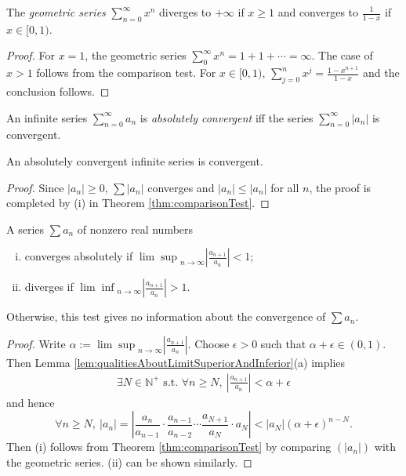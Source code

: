 \begin{thm}
  \label{thm:geometricSeries}
  The \emph{geometric series} $\sum_{n=0}^{\infty} x^n$
  diverges to $+\infty$ if $x\ge 1$
  and converges to $\frac{1}{1-x}$ if $x\in [0,1)$.
\end{thm}
\begin{proof}
  For $x=1$, the geometric series
  $\sum_0^{\infty} x^n = 1 + 1+\cdots = \infty$.
  The case of $x>1$ follows from the comparison test.
  For $x\in[0,1)$,
  $\sum_{j=0}^{n} x^j = \frac{1-x^{n+1}}{1-x}$
  and the conclusion follows.
\end{proof}

\begin{defn}
  \label{def:absoluteConvergence}
  An infinite series $\sum_{n=0}^{\infty} a_n$
  is \emph{absolutely convergent}
  iff the series $\sum_{n=0}^{\infty} |a_n|$ is convergent.
\end{defn}

\begin{lem}
  \label{lem:absolutelyConvergenceSeriesConverge}
  An absolutely convergent infinite series is convergent.
\end{lem}
\begin{proof}
  Since $|a_{n}|\ge 0$,  $\sum |a_{n}|$ converges and
  $|a_{n}|\le |a_{n}|$ for all $n$, the proof is completed by
  (i) in Theorem \ref{thm:comparisonTest}.
\end{proof}

\begin{thm}
  \label{thm:ratioTest}
  A series $\sum a_n$ of nonzero real numbers 
  \begin{enumerate}[(i)]\itemsep0em
  \item converges absolutely if
    ${\lim\sup}_{n\rightarrow\infty}|\frac{a_{n+1}}{a_n}|<1$;
  \item diverges if ${\lim\inf}_{n\rightarrow\infty}|\frac{a_{n+1}}{a_n}|>1$. 
  \end{enumerate}
  Otherwise, this test gives no information
  about the convergence of $\sum a_n$.
\end{thm}
\begin{proof}
  Write $\alpha:={\lim\sup}_{n\rightarrow\infty}|\frac{a_{n+1}}{a_n}|$.
  Choose $\epsilon>0$ such that $\alpha+\epsilon\in(0,1)$.
  Then Lemma \ref{lem:qualitiesAboutLimitSuperiorAndInferior}(a) implies
  \begin{displaymath}
    \begin{array}{l}
    \exists N\in \mathbb{N}^{+} \text{ s.t. }
    \forall n\ge N,\ 
    \left|\frac{a_{n+1}}{a_{n}}\right|<\alpha+\epsilon
    \end{array}
  \end{displaymath}
  and hence
  \begin{displaymath}
    \forall n\ge N,\ 
    |a_{n}|=\left|\frac{a_{n}}{a_{n-1}}\cdot \frac{a_{n-1}}{a_{n-2}}
     \cdots \frac{a_{N+1}}{a_{N}}\cdot a_{N}  \right|
    <|a_{N}|(\alpha+\epsilon)^{n-N}.
  \end{displaymath}
  Then (i) follows from Theorem \ref{thm:comparisonTest}
  by comparing $(|a_n|)$ with the geometric series.
  (ii) can be shown similarly.
\end{proof}

